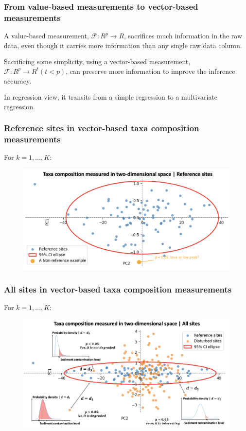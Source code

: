 \documentclass{beamer}
\begin{document}
\begin{frame}
\frametitle{From value-based measurements to vector-based measurements}

A value-based measurement, \(\mathcal{F}: R^p \to R\), sacrifices much information in the raw data, even though it 
carries more information than any single raw data column.

Sacrificing some simplicity, using a vector-based measurement, \(\mathcal{F}: R^p \to R^t (t < p)\),
can preserve more information to improve the inference accuracy.

In regression view, it transits from a simple regression to a multivariate regression.

\end{frame}

\begin{frame}
\frametitle{Reference sites in vector-based taxa composition measurements}
For \(k = 1, ..., K\):

\begin{figure}
    \centering
    \includegraphics[width=\textwidth]{figures/p17_reference_area_in_2dimensional.png}
\end{figure}

\end{frame}

\begin{frame}
\frametitle{All sites in vector-based taxa composition measurements}
For \(k = 1, ..., K\):
\begin{figure}
    \centering
    \includegraphics[width=\textwidth]{figures/p18_all_sites_in_2dimensional.png}
\end{figure}

\end{frame}
\end{document}
